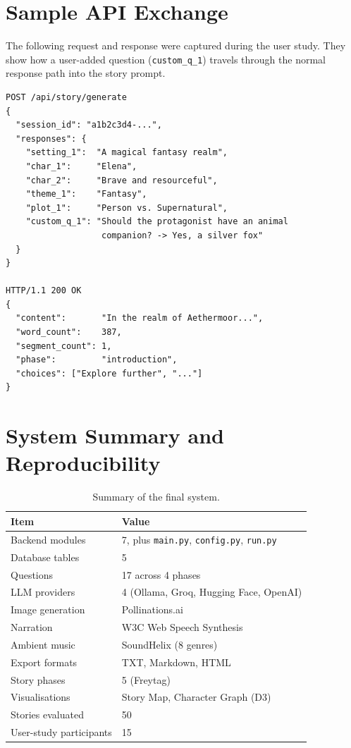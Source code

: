 \begin{appendices}

\chapter{Sample API Exchange}

The following request and response were captured during the user study. They show how a user-added question (\texttt{custom\_q\_1}) travels through the normal response path into the story prompt.

\begin{lstlisting}
POST /api/story/generate
{
  "session_id": "a1b2c3d4-...",
  "responses": {
    "setting_1":  "A magical fantasy realm",
    "char_1":     "Elena",
    "char_2":     "Brave and resourceful",
    "theme_1":    "Fantasy",
    "plot_1":     "Person vs. Supernatural",
    "custom_q_1": "Should the protagonist have an animal
                   companion? -> Yes, a silver fox"
  }
}

HTTP/1.1 200 OK
{
  "content":       "In the realm of Aethermoor...",
  "word_count":    387,
  "segment_count": 1,
  "phase":         "introduction",
  "choices": ["Explore further", "..."]
}
\end{lstlisting}

\chapter{System Summary and Reproducibility}

\begin{table}[H]
\centering
\caption{Summary of the final system.}
\renewcommand{\arraystretch}{1.2}
\begin{tabular}{|l|l|}
\hline
\textbf{Item} & \textbf{Value} \\
\hline
Backend modules          & 7, plus \texttt{main.py}, \texttt{config.py}, \texttt{run.py} \\
Database tables          & 5 \\
Questions                & 17 across 4 phases \\
LLM providers            & 4 (Ollama, Groq, Hugging Face, OpenAI) \\
Image generation         & Pollinations.ai \\
Narration                & W3C Web Speech Synthesis \\
Ambient music            & SoundHelix (8 genres) \\
Export formats           & TXT, Markdown, HTML \\
Story phases             & 5 (Freytag) \\
Visualisations           & Story Map, Character Graph (D3) \\
Stories evaluated        & 50 \\
User-study participants  & 15 \\
\hline
\end{tabular}
\end{table}


\end{appendices}
